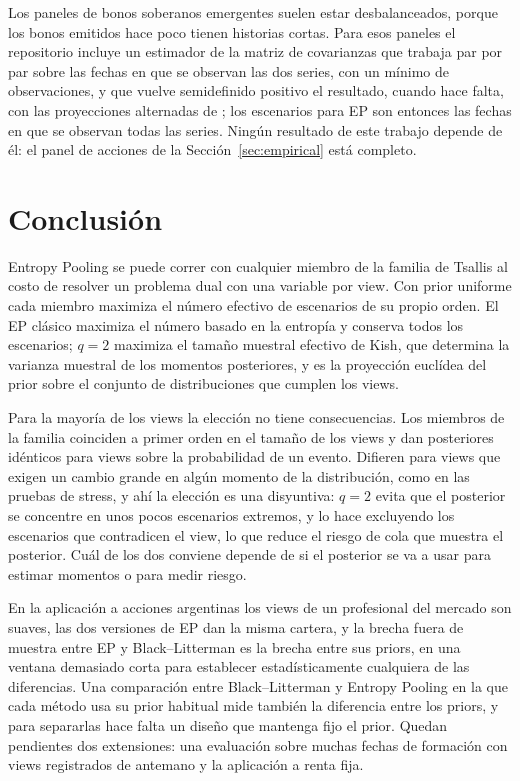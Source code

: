 \documentclass[11pt]{article}
\begin{document}
Los paneles de bonos soberanos emergentes suelen estar desbalanceados,
porque los bonos emitidos hace poco tienen historias cortas. Para esos
paneles el repositorio incluye un estimador de la matriz de covarianzas que
trabaja par por par sobre las fechas en que se observan las dos
series, con un m\'inimo de observaciones, y que vuelve semidefinido
positivo el resultado, cuando hace falta, con las proyecciones alternadas
de \citet{Higham2002}; los escenarios para EP son entonces las fechas en
que se observan todas las series. Ning\'un resultado de este trabajo
depende de \'el: el panel de acciones de la
Secci\'on~\ref{sec:empirical} est\'a completo.

\section{Conclusi\'on}\label{sec:conclusion}

Entropy Pooling se puede correr con cualquier miembro de la familia de
Tsallis al costo de resolver un problema dual con una variable por view.
Con prior uniforme cada miembro maximiza el n\'umero efectivo de escenarios
de su propio orden. El EP cl\'asico maximiza el n\'umero basado en la entrop\'ia
y conserva todos los escenarios; $q=2$ maximiza el tama\~no muestral efectivo
de Kish, que determina la varianza muestral de los momentos posteriores, y
es la proyecci\'on eucl\'idea del prior sobre el conjunto de distribuciones
que cumplen los views.

Para la mayor\'ia de los views la elecci\'on no tiene consecuencias. Los
miembros de la familia coinciden a primer orden en el tama\~no de los views
y dan posteriores id\'enticos para views sobre la probabilidad de un evento.
Difieren para views que exigen un cambio grande en alg\'un momento de la distribuci\'on, como en las
pruebas de stress, y ah\'i la elecci\'on es una disyuntiva: $q=2$ evita que el
posterior se concentre en unos pocos escenarios extremos, y lo hace
excluyendo los escenarios que contradicen el view, lo que reduce el riesgo
de cola que muestra el posterior. Cu\'al de los dos conviene depende de si
el posterior se va a usar para estimar momentos o para medir riesgo.

En la aplicaci\'on a acciones argentinas los views de un profesional del
mercado son suaves, las dos versiones de EP dan la misma cartera, y la
brecha fuera de muestra entre EP y Black--Litterman es la brecha entre sus
priors, en una ventana demasiado corta para establecer estad\'isticamente
cualquiera de las diferencias. Una comparaci\'on entre Black--Litterman y
Entropy Pooling en la que cada m\'etodo usa su prior habitual mide tambi\'en
la diferencia entre los priors, y para separarlas hace falta un dise\~no
que mantenga fijo el prior. Quedan pendientes dos
extensiones: una evaluaci\'on sobre muchas fechas de
formaci\'on con views registrados de antemano y la aplicaci\'on a renta fija.
\end{document}
